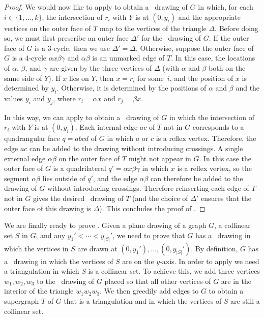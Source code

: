 \begin{proof}
We would now like to apply  to obtain a \Fary\ drawing
of $G$ in which, for each $i\in\{1,\ldots,k\}$, the intersection of
$r_i$ with $Y$ is at $(0,y_i)$ and the appropriate vertices on the
outer face of $T$ map to the vertices of the triangle $\Delta$.
Before doing so, we must first prescribe an outer face $\Delta'$ for
the \Fary\ drawing of $G$.  If the outer face of $G$ is a 3-cycle,
then we use $\Delta'=\Delta$.  Otherwise, suppose the outer face of
$G$ is a 4-cycle $\alpha x\beta\gamma$ and $\alpha\beta$ is an
unmarked edge of $T$.  In this case, the locations of $\alpha$,
$\beta$, and $\gamma$ are given by the three vertices of $\Delta$
(with $\alpha$ and $\beta$ both on the same side of $Y$).
If $x$ lies on $Y$,
then $x=r_i$ for some~$i$, %
and the
position of $x$ is determined by $y_i$.
Otherwise, it is determined
by the positions of $\alpha$ and $\beta$ and the values
$y_{i}$ and $y_j$, where $r_i=\alpha x$ and $r_j=\beta x$.
\ifSODA{}\fi

	In this way, we can apply  to
	obtain a \Fary\ drawing of $G$ in which the intersection of $r_i$
	with $Y$ is at $(0,y_i)$.  Each internal edge $ac$ of $T$ not in $G$
	corresponds to a quadrangular face $q=abcd$ of $G$ in which $a$ or $c$ is a
	reflex vertex.  Therefore, the edge $ac$ can be added to the drawing
	without introducing crossings.  A single external edge $\alpha\beta$
	on the outer face of $T$ might not appear in $G$. In this case the outer
	face of $G$ is a quadrilateral $q'=\alpha x \beta \gamma$ in which $x$ is
	a reflex vertex, so the segment $\alpha\beta$ lies outside of $q'$, and the edge $\alpha\beta$ can therefore be added to the drawing of $G$
	without introducing crossings. Therefore reinserting each edge of $T$ not in $G$ gives the desired \Fary\ drawing of $T$ (and the choice of $\Delta'$ ensures that the outer face of this drawing is $\Delta$). 
        This concludes the proof of .
\end{proof}

We are finally ready to prove . Given a plane drawing of
a graph $G$, a collinear set $S$ in $G$, and any $y_1'<\cdots<y_{|S|}'$,
we need to prove that $G$ has a \Fary\ drawing in which the vertices in
$S$ are drawn at $(0,y_1'),\ldots,(0,y_{|S|}')$.  By definition, $G$ has a \Fary\ drawing in which the vertices of $S$ are on the $y$-axis.
In order to apply  we need a triangulation in which $S$ is a collinear set.  To achieve this, we add three vertices $w_1,w_2,w_3$ to the \Fary\ drawing of $G$ placed so that all other vertices of $G$ are in the interior of the triangle $w_1w_2w_3$.  We then greedily add edges to $G$ to obtain a supergraph $T$ of $G$ that is a triangulation and in which the vertices of $S$ are still a collinear set.  

